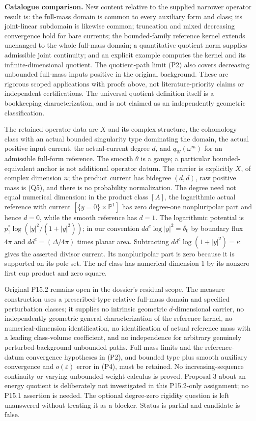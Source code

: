 \documentclass[
  11pt,
]{article}
\begin{document}
\textbf{Catalogue comparison.} New content relative to the supplied
narrower operator result is: the full-mass domain is common to every
auxiliary form and class; its joint-linear subdomain is likewise common;
truncation and mixed decreasing convergence hold for bare currents; the
bounded-family reference kernel extends unchanged to the whole full-mass
domain; a quantitative quotient norm supplies admissible joint
continuity; and an explicit example computes the kernel and its
infinite-dimensional quotient. The quotient-path limit (P2) also covers
decreasing unbounded full-mass inputs positive in the original
background. These are rigorous scoped applications with proofs above,
not literature-priority claims or independent certifications. The
universal quotient definition itself is a bookkeeping characterization,
and is not claimed as an independently geometric classification.

The retained operator data are \(X\) and its complex structure, the
cohomology class with an actual bounded singularity type dominating the
domain, the actual positive input current, the actual-current degree
\(d\), and \(q_W(\omega^m)\) for an admissible full-form reference. The
smooth \(\theta\) is a gauge; a particular bounded-equivalent anchor is
not additional operator datum. The carrier is explicitly \(X\), of
complex dimension \(n\); the product current has bidegree \((d,d)\), raw
positive mass is (Q5), and there is no probability normalization. The
degree need not equal numerical dimension: in the product class \([A]\),
the logarithmic actual reference with current
\([\{y=0\}\times\mathbb P^1]\) has zero degree-one nonpluripolar part
and hence \(d=0\), while the smooth reference has \(d=1\). The
logarithmic potential is \(p_1^*\log(|y|^2/(1+|y|^2))\); in our
convention \(dd^c\log|y|^2=\delta_0\) by boundary flux \(4\pi\) and
\(dd^c=(\Delta/4\pi)\) times planar area. Subtracting
\(dd^c\log(1+|y|^2)=\kappa\) gives the asserted divisor current. Its
nonpluripolar part is zero because it is supported on its pole set. The
nef class has numerical dimension \(1\) by its nonzero first cup product
and zero square.

Original P15.2 remains open in the dossier's residual scope. The measure
construction uses a prescribed-type relative full-mass domain and
specified perturbation classes; it supplies no intrinsic geometric
\(d\)-dimensional carrier, no independently geometric general
characterization of the reference kernel, no numerical-dimension
identification, no identification of actual reference mass with a
leading class-volume coefficient, and no independence for arbitrary
genuinely perturbed-background unbounded paths. Full-mass limits and the
reference-datum convergence hypotheses in (P2), and bounded type plus
smooth auxiliary convergence and \(o(\varepsilon)\) error in (P4), must
be retained. No increasing-sequence continuity or varying
unbounded-weight calculus is proved. Proposal 3 about an energy quotient
is deliberately not investigated in this P15.2-only assignment; no P15.1
assertion is needed. The optional degree-zero rigidity question is left
unanswered without treating it as a blocker. Status is partial and
candidate is false.
\end{document}

